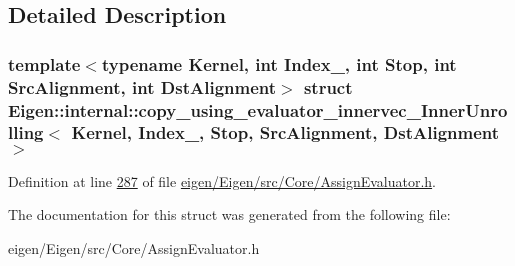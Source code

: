 \subsection{Detailed Description}
\subsubsection*{template$<$typename Kernel, int Index\+\_\+, int Stop, int Src\+Alignment, int Dst\+Alignment$>$\newline
struct Eigen\+::internal\+::copy\+\_\+using\+\_\+evaluator\+\_\+innervec\+\_\+\+Inner\+Unrolling$<$ Kernel, Index\+\_\+, Stop, Src\+Alignment, Dst\+Alignment $>$}



Definition at line \hyperlink{eigen_2_eigen_2src_2_core_2_assign_evaluator_8h_source_l00287}{287} of file \hyperlink{eigen_2_eigen_2src_2_core_2_assign_evaluator_8h_source}{eigen/\+Eigen/src/\+Core/\+Assign\+Evaluator.\+h}.



The documentation for this struct was generated from the following file\+:\begin{DoxyCompactItemize}
\item 
eigen/\+Eigen/src/\+Core/\+Assign\+Evaluator.\+h\end{DoxyCompactItemize}
